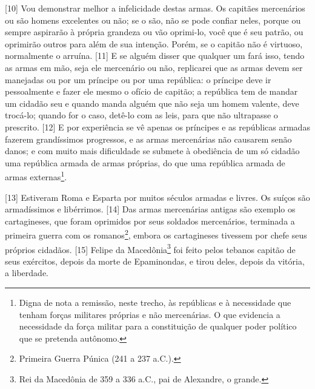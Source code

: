 {[}10{]} Vou demonstrar melhor a infelicidade destas armas. Os capitães
mercenários ou são homens excelentes ou não; se o são, não se pode
confiar neles, porque ou sempre aspirarão à própria grandeza ou vão
oprimi-lo, você que é seu patrão, ou oprimirão outros para além de sua
intenção. Porém, se o capitão não é virtuoso, normalmente o arruína.
{[}11{]} E se alguém disser que qualquer um fará isso, tendo as armas em
mão, seja ele mercenário ou não, replicarei que as armas devem ser
manejadas ou por um príncipe ou por uma república: o príncipe deve ir
pessoalmente e fazer ele mesmo o ofício de capitão; a república tem de
mandar um cidadão seu e quando manda alguém que não seja um homem
valente, deve trocá-lo; quando for o caso, detê-lo com as leis, para que
não ultrapasse o prescrito. {[}12{]} E por experiência se vê apenas os
príncipes e as repúblicas armadas fazerem grandíssimos progressos, e as
armas mercenárias não causarem senão danos; e com muito mais dificuldade
se submete à obediência de um só cidadão uma república armada de armas
próprias, do que uma república armada de armas externas\footnote{Digna
  de nota a remissão, neste trecho, às repúblicas e à necessidade que
  tenham forças militares próprias e não mercenárias. O que evidencia a
  necessidade da força militar para a constituição de qualquer poder
  político que se pretenda autônomo.}.

{[}13{]} Estiveram Roma e Esparta por muitos séculos armadas e livres.
Os suíços são armadíssimos e libérrimos. {[}14{]} Das armas mercenárias
antigas são exemplo os cartagineses, que foram oprimidos por seus
soldados mercenários, terminada a primeira guerra com os
romanos\footnote{Primeira Guerra Púnica (241 a 237 a.C.).}, embora os
cartagineses tivessem por chefe seus próprios cidadãos. {[}15{]} Felipe
da Macedônia\footnote{Rei da Macedônia de 359 a 336 a.C., pai de
  Alexandre, o grande.} foi feito pelos tebanos capitão de seus
exércitos, depois da morte de Epaminondas, e tirou deles, depois da
vitória, a liberdade.

